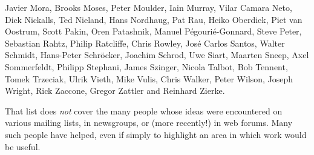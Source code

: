 \begin{introduction}
Javier Mora, %
Brooks Moses, %
Peter Moulder, %
Iain Murray, %
Vilar Camara Neto, %
Dick Nickalls,
Ted Nieland,
Hans Nordhaug,
Pat Rau,
Heiko Oberdiek,
Piet van Oostrum,
Scott Pakin, %
Oren Patashnik,
Manuel P\'egouri\'e-Gonnard, %
Steve Peter, %
Sebastian Rahtz, %
Philip Ratcliffe, %
Chris Rowley, %
Jos\'e Carlos Santos, %
Walter Schmidt,
Hans-Peter Schr\"ocker,
Joachim Schrod,
Uwe Siart, %
Maarten Sneep, %
Axel Sommerfeldt, %
Philipp Stephani, %
James Szinger, %
Nicola Talbot, %
Bob Tennent, %
Tomek Trzeciak, %
Ulrik Vieth,
Mike Vulis, %
Chris Walker, %
Peter Wilson, %
Joseph Wright, %
Rick Zaccone,
Gregor Zattler %
and
Reinhard Zierke.

That list does \emph{not} cover the many people whose ideas were
encountered on various mailing lists, in newsgroups, or (more
recently!) in web forums.  Many 
such people have helped, even if simply to highlight an area in which
 work would be useful.
\endhtmlignore
\end{introduction}
